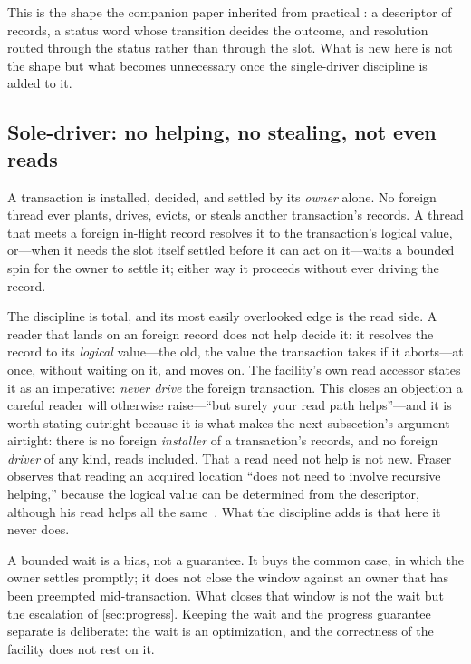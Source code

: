 \documentclass[11pt]{article}
\begin{document}
This is the shape the companion paper inherited from practical \mcas
\citep{harris2002mcas, fraser2004lockfreedom}: a descriptor of records, a status
word whose transition decides the outcome, and resolution routed through the
status rather than through the slot. What is new here is not the shape but what
becomes unnecessary once the single-driver discipline is added to it.

\subsection{Sole-driver: no helping, no stealing, not even reads}
\label{sec:soledriver}

\begin{definition}
\label{def:soledriver}
A transaction is installed, decided, and settled by its \emph{owner} alone. No
foreign thread ever plants, drives, evicts, or steals another transaction's
records. A thread that meets a foreign in-flight record resolves it to the
transaction's logical value, or---when it needs the slot itself settled before it
can act on it---waits a bounded spin for the owner to settle it; either way it
proceeds without ever driving the record.
\end{definition}

The discipline is total, and its most easily overlooked edge is the read side. A
reader that lands on an \UNDECIDED foreign record does not help decide it: it
resolves the record to its \emph{logical} value---the old, the value the
transaction takes if it aborts---at once, without waiting on it, and moves on. The
facility's own read accessor states it as an imperative: \emph{never drive} the
foreign transaction. This closes an objection a careful reader will otherwise
raise---``but surely your read path helps''---and it is worth stating outright
because it is what makes the next subsection's argument airtight: there is no
foreign \emph{installer} of a transaction's records, and no foreign \emph{driver}
of any kind, reads included. That a read need not help is not new. Fraser
observes that reading an acquired location ``does not need to involve recursive
helping,'' because the logical value can be determined from the descriptor,
although his \mcas read helps all the same~\citep{fraser2004lockfreedom}. What
the discipline adds is that here it never does.

A bounded wait is a bias, not a guarantee. It buys the common case, in which the
owner settles promptly; it does not close the window against an owner that has
been preempted mid-transaction. What closes that window is not the wait but the
escalation of \cref{sec:progress}. Keeping the wait and the progress guarantee
separate is deliberate: the wait is an optimization, and the correctness of the
facility does not rest on it.
\end{document}
